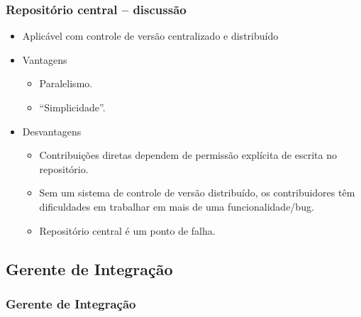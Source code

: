 \documentclass{beamer}
\begin{document}
\begin{frame}
  \frametitle{Repositório central -- discussão}
  \begin{itemize}
    \item Aplicável com controle de versão centralizado e distribuído
    \item Vantagens
      \begin{itemize}
        \item<2-> Paralelismo.
        \item<3-> ``Simplicidade''.
      \end{itemize}
    \item Desvantagens
      \begin{itemize}
        \item<4-> Contribuições diretas dependem de permissão explícita de
          escrita no repositório.
        \item<5-> Sem um sistema de controle de versão distribuído, os
          contribuidores têm dificuldades em trabalhar em mais de uma
          funcionalidade/bug.
        \item <6->Repositório central é um ponto de falha.
      \end{itemize}
  \end{itemize}
\end{frame}

\subsection{Gerente de Integração}

\begin{frame}
  \frametitle{Gerente de Integração}
  \begin{figure}[h]
    \begin{center}
    \end{center}
    \label{fig:integration-manager}
  \end{figure}
\end{frame}
\end{document}
